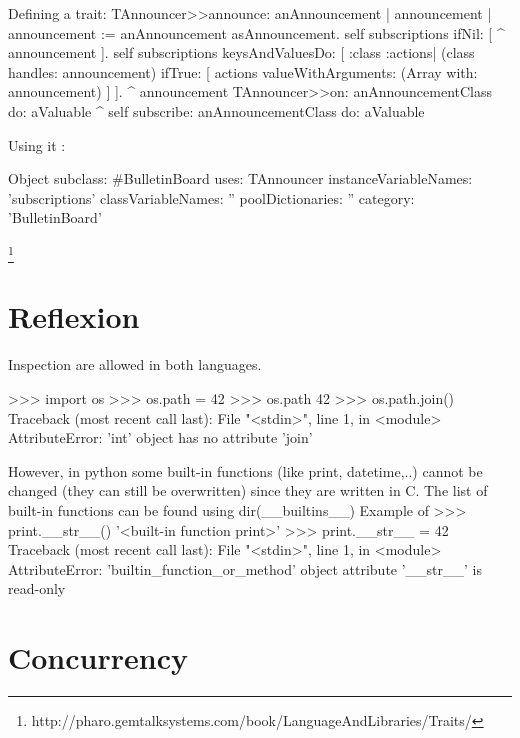 \documentclass[12pt,a4paper,twocolumn]{scrartcl}
\begin{document}
Defining a trait:
TAnnouncer>>announce: anAnnouncement
    | announcement |
    announcement := anAnnouncement asAnnouncement.
    self subscriptions ifNil: [ ^ announcement ].
    self subscriptions keysAndValuesDo: [ :class :actions|
        (class handles: announcement) 
            ifTrue: [ actions valueWithArguments: (Array with: announcement) ] ].
    ^ announcement
TAnnouncer>>on: anAnnouncementClass do: aValuable
    ^ self subscribe: anAnnouncementClass do: aValuable


Using it : 

Object subclass: #BulletinBoard
    uses: TAnnouncer
    instanceVariableNames: 'subscriptions'
    classVariableNames: ''
    poolDictionaries: ''
    category: 'BulletinBoard'

\footnote{http://pharo.gemtalksystems.com/book/LanguageAndLibraries/Traits/}
\section{Reflexion}
Inspection are allowed in both languages. 

>>> import os
>>> os.path = 42
>>> os.path
42
>>> os.path.join()
Traceback (most recent call last):
  File "<stdin>", line 1, in <module>
AttributeError: 'int' object has no attribute 'join'

However, in python some built-in functions (like print, datetime,..) cannot be changed (they can still be overwritten) since they are written in C.
The list of built-in functions can be found using dir(__builtins__)
Example of 
>>> print.__str__()
'<built-in function print>'
>>> print.__str__ = 42
Traceback (most recent call last):
  File "<stdin>", line 1, in <module>
AttributeError: 'builtin_function_or_method' object attribute '__str__' is read-only



\section{Concurrency}
\end{document}
